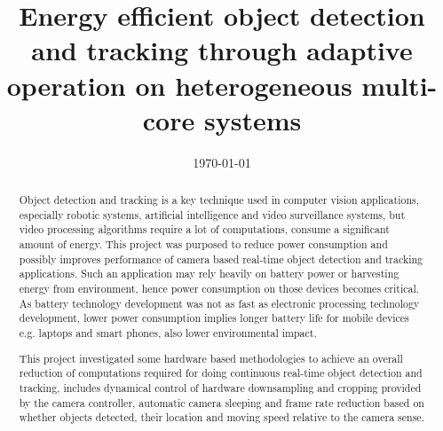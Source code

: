 \documentclass[openany]{ecsproject}     %
\begin{document}
\frontmatter
\title      {Energy efficient object detection and tracking through adaptive operation on heterogeneous multi-core systems}
\addresses  {\groupname\\\deptname\\\univname}
\date       {\today}
\subject    {}
\keywords   {}
\maketitle

\begin{abstract}
Object detection and tracking is a key technique used in computer vision applications, especially robotic systems, artificial intelligence and video surveillance systems, but video processing algorithms require a lot of computations, consume a significant amount of energy. This project was purposed to reduce power consumption and possibly improves performance of camera based real-time object detection and tracking applications. Such an application may rely heavily on battery power or harvesting energy from environment, hence power consumption on those devices becomes critical. As battery technology development was not as fast as electronic processing technology development, lower power consumption implies longer battery life for mobile devices e.g. laptops and smart phones, also lower environmental impact.

This project investigated some hardware based methodologies to achieve an overall reduction of computations required for doing continuous real-time object detection and tracking, includes dynamical control of hardware downsampling and cropping provided by the camera controller, automatic camera sleeping and frame rate reduction based on whether objects detected, their location and moving speed relative to the camera sense.
\end{abstract}

\tableofcontents

\mainmatter






\appendix
%

\backmatter

\end{document}

